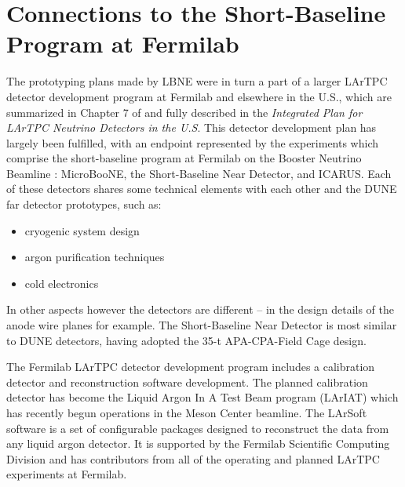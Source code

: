 \section{Connections to the Short-Baseline Program at Fermilab} 
\label{sec:proto-sbn}


The prototyping plans made by LBNE were in turn a part of a larger
LArTPC detector development program at Fermilab and elsewhere in the
U.S., which are summarized in Chapter 7 of \anxlbnefd and fully
described in the \textit{Integrated Plan for LArTPC Neutrino Detectors in the U.S}.
This detector development plan has largely been fulfilled, with an
endpoint represented by the experiments which comprise the
short-baseline program at Fermilab on the Booster Neutrino Beamline :
MicroBooNE, the Short-Baseline Near Detector, and ICARUS.
Each of these detectors shares some technical elements with each other and 
the DUNE far detector prototypes, such as:
\begin{itemize}
\item cryogenic system design
\item argon purification techniques
\item cold electronics
\end{itemize}
In other aspects however the detectors are different -- in the design
details of the anode wire planes for example.  The Short-Baseline Near
Detector is most similar to DUNE detectors, having adopted the 35-t
APA-CPA-Field Cage design.

The Fermilab LArTPC detector development program includes a
calibration detector and reconstruction software development.  The
planned calibration detector has become the Liquid Argon In A Test
Beam program (LArIAT) which has recently begun operations in the Meson
Center beamline.  The LArSoft software is a set of configurable
packages designed to reconstruct the data from any liquid argon
detector.  It is supported by the Fermilab Scientific Computing
Division and has contributors from all of the operating and planned
LArTPC experiments at Fermilab.
